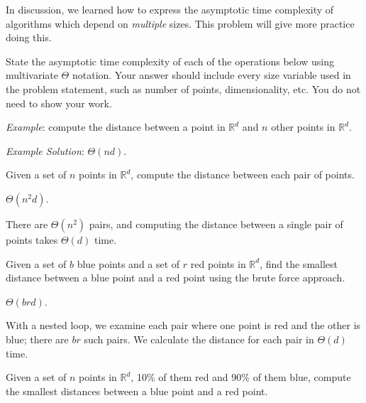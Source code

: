\begin{prob}
    In discussion, we learned how to express the asymptotic time complexity of
    algorithms which depend on \emph{multiple} sizes. This problem will give more practice
    doing this.

    State the asymptotic time complexity of each of the operations below using
    multivariate $\Theta$ notation. Your answer should include every size variable used in
    the problem statement, such as number of points, dimensionality, etc. You
    do not need to show your work.

    \emph{Example}: compute the distance between a point in $\mathbb R^d$ and $n$ other
    points in $\mathbb R^d$.
    
    \emph{Example Solution}: $\Theta(nd)$.


    \begin{subprobset}
        \begin{subprob}
            Given a set of $n$ points in $\mathbb R^d$, compute the distance between
            each pair of points.

            \begin{soln}
                $\Theta(n^2 d)$.

                There are $\Theta(n^2)$ pairs, and computing the distance between a
                single pair of points takes $\Theta(d)$ time.
            \end{soln}
        \end{subprob}

        \begin{subprob}
            Given a set of $b$ blue points and a set of $r$ red points in $\mathbb R^d$,
            find the smallest distance between a blue point and a red point using the
            brute force approach.

            \begin{soln}
                $\Theta(brd)$.

                With a nested loop, we examine each pair where one point is red and the
                other is blue; there are $br$ such pairs. We calculate the distance for
                each pair in $\Theta(d)$ time.
            \end{soln}
        \end{subprob}


        \begin{subprob}
            Given a set of $n$ points in $\mathbb R^d$, 10\% of them red and
            90\% of them blue, compute the smallest distances between a blue point and a
            red point.


\end{subprob}
\end{subprobset}
\end{prob}
